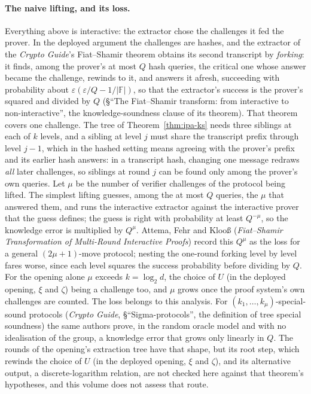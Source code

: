 \documentclass[11pt,a4paper]{article}
\theoremstyle{definition}
\newcommand{\F}{\mathbb{F}}
\begin{document}
\paragraph{The naive lifting, and its loss.}
Everything above is interactive: the extractor chose the challenges it
fed the prover. In the deployed argument the challenges are hashes, and
the extractor of the \emph{Crypto Guide}'s Fiat--Shamir theorem obtains
its second transcript by \emph{forking}: it finds, among the prover's
at most $Q$ hash queries, the critical one whose answer became the
challenge, rewinds to it, and answers it afresh, succeeding with
probability about $\varepsilon(\varepsilon/Q - 1/|\F|)$, so that the
extractor's success is the prover's squared and divided by $Q$
(\S``The Fiat--Shamir transform: from interactive to non-interactive'',
the knowledge-soundness clause of its theorem). That theorem covers one
challenge. The tree of Theorem~\ref{thm:ipa-ks} needs three siblings at
each of $k$ levels, and a sibling at level $j$ must share the
transcript prefix through level $j - 1$, which in the hashed setting
means agreeing with the prover's prefix and its earlier hash answers:
in a transcript hash, changing one message redraws \emph{all} later
challenges, so siblings at round $j$ can be found only among the
prover's own queries. Let $\mu$ be the number of verifier challenges of
the protocol being lifted. The simplest lifting guesses, among the at most
$Q$ queries, the $\mu$ that answered them, and runs the
interactive extractor against the interactive prover that the guess
defines; the guess is right with probability at least $Q^{-\mu}$, so
the knowledge error is multiplied by $Q^{\mu}$. Attema, Fehr and
Kloo\ss{} (\emph{Fiat--Shamir Transformation of Multi-Round Interactive
Proofs}) record this $Q^{\mu}$ as the loss for a general
$(2\mu + 1)$-move protocol; nesting the one-round forking level by level
fares worse, since each level squares the success probability before
dividing by $Q$. For the opening alone $\mu$ exceeds $k = \log_2 d$,
the choice of $U$ (in the deployed opening, $\xi$ and $\zeta$) being a
challenge too, and $\mu$ grows once the proof system's own challenges
are counted. The loss
belongs to this analysis. For $(k_1, \dots, k_\mu)$-special-sound
protocols (\emph{Crypto Guide}, \S``Sigma-protocols'', the definition of
tree special soundness) the same authors prove, in the random oracle
model and with no idealisation of the group, a knowledge error that
grows only linearly in $Q$. The rounds of the opening's extraction tree
have that shape, but its root step, which rewinds the choice of $U$ (in
the deployed opening, $\xi$ and $\zeta$), and its alternative output, a
discrete-logarithm relation, are not checked here against that
theorem's hypotheses, and this volume does not assess that route.
\end{document}

